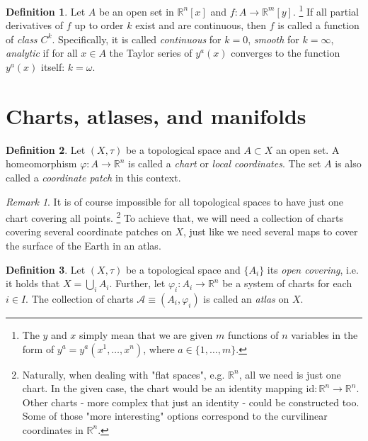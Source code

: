 \documentclass[a4paper,11pt]{article}
\theoremstyle{theorem}
\theoremstyle{remark}
\newtheorem*{remark}{Remark}
\theoremstyle{definition}
\newtheorem{definition}{Definition}
\begin{document}
		\begin{definition}
			Let $A$ be an open set in $\mathbb R^n[x]$ and $f: A \to \mathbb R^m[y]$.%
				\footnote{The $y$ and $x$ simply mean that we are given $m$ functions of $n$ variables in the form of $y^a = y^a(x^1,\dots,x^n)$, where $a \in \{1,\dots,m\}$.}
			If all partial derivatives of $f$ up to order $k$ exist and are continuous, then $f$ is called a function of \emph{class $C^k$}. Specifically, it is called \emph{continuous} for $k=0$, \emph{smooth} for $k=\infty$, \emph{analytic} if for all $x \in A$ the Taylor series of $y^a(x)$ converges to the function $y^a(x)$ itself: $k=\omega$.
		\end{definition}
	
	\section{Charts, atlases, and manifolds}
	
		\begin{definition}
			Let $(X,\tau)$ be a topological space and $A \subset X$ an open set. A homeomorphism $\varphi: A \to \mathbb R^n$ is called a \emph{chart} or \emph{local coordinates}. The set $A$ is also called a \emph{coordinate patch} in this context.
		\end{definition}
		
		\begin{remark}
			It is of course impossible for all topological spaces to have just one chart covering all points.%
				\footnote{Naturally, when dealing with "flat spaces", e.g. $\mathbb R^n$, all we need is just one chart. In the given case, the chart would be an identity mapping $\mathrm{id}: \mathbb R^n \to \mathbb R^n$. Other charts - more complex that just an identity - could be constructed too. Some of those "more interesting" options correspond to the curvilinear coordinates in $\mathbb R^n$.}
			To achieve that, we will need a collection of charts covering several coordinate patches on $X$, just like we need several maps to cover the surface of the Earth in an atlas.
		\end{remark}
		
		\begin{definition}
			Let $(X,\tau)$ be a topological space and $\{A_i\}$ its \emph{open covering}, i.e. it holds that $X = \bigcup_{i} A_i$. Further, let $\varphi_i: A_i \to \mathbb R^n$ be a system of charts for each $i \in I$. The collection of charts $\mathcal A \equiv (A_i,\varphi_i)$ is called an \emph{atlas} on $X$.
		\end{definition}
	
\end{document}
